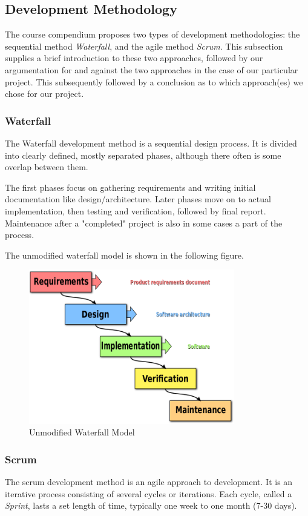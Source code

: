 \subsection{Development Methodology}
The course compendium proposes two types of development methodologies: the sequential method \emph{Waterfall}, and the agile method \emph{Scrum}. This subsection supplies a brief introduction to these two approaches, followed by our argumentation for and against the two approaches in the case of our particular project. This subsequently followed by a conclusion as to which approach(es) we chose for our project.

\newpage
\subsubsection{Waterfall}
The Waterfall development method is a sequential design process. It is divided into clearly defined, mostly separated phases, although there often is some overlap between them.

The first phases focus on gathering requirements and writing initial documentation like design/architecture. Later phases move on to actual implementation, then testing and verification, followed by final report. Maintenance after a "completed" project is also in some cases a part of the process.

The unmodified waterfall model is shown in the following figure.

\begin{figure}[H]
\centering
\includegraphics[width=0.8\textwidth]{images/Waterfall-model.png}
\caption{Unmodified Waterfall Model \cite{waterfallModel}}
\label{fig:Waterfall_model}
\end{figure}

\newpage
\subsubsection{Scrum}
The scrum development method is an agile approach to development. It is an iterative process consisting of several cycles or iterations. Each cycle, called a \emph{Sprint}, lasts a set length of time, typically one week to one month (7-30 days).

